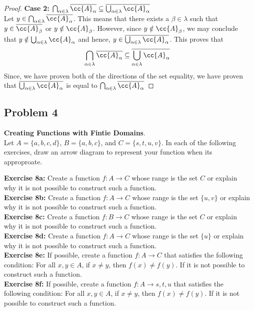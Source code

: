 \begin{proof}
        \textbf{Case 2:  $\bigcap_{\alpha \in \lambda} \overline{\cc{A}_\alpha} \subseteq \overline{\bigcup_{\alpha \in \lambda} \cc{A}_\alpha }$} \\ 
            Let $y \in \bigcap_{\alpha \in \lambda} \overline{\cc{A}_\alpha}$. This means that there exists a $\beta \in \lambda$ such that $y \in \overline{\cc{A}_\beta}$ or $y \notin \cc{A}_\beta$. However, since $y \notin \cc{A}_\beta$, we may conclude that $y \notin \bigcup_{\alpha \in \lambda} \cc{A}_\alpha$ and hence, $y \in  \overline{\bigcup_{\alpha \in \lambda} \cc{A}_\alpha }$. This proves that
                \begin{equation*}
                    \bigcap_{\alpha \in \lambda} \overline{\cc{A}_\alpha} \subseteq \overline{\bigcup_{\alpha \in \lambda} \cc{A}_\alpha }
                \end{equation*}
        Since, we have proven both of the directions of the set equality, we have proven that $ \overline{\bigcup_{\alpha \in \lambda} \cc{A}_\alpha }$ is equal to $\bigcap_{\alpha \in \lambda} \overline{\cc{A}_\alpha}$    
    \end{proof}




\newpage
\subsection{Problem 4}
    \begin{tcolorbox}
        \textbf{Creating Functions with Fintie Domains}. \\
        Let $A = \{a,b,c,d \}$, $B = \{ a, b, c \}$, and $C = \{s,t,u,v \}$. In each of the following exercises, draw an arrow diagram to represent your function when its approproate. 
    \end{tcolorbox}

    \textbf{Exercise 8a:} Create a function $f: A \to C$ whose range is the set $C$ or explain why it is not possible to construct such a function. \\
    \textbf{Exercise 8b:} Create a function $f: A \to C$ whose range is the set $\{u, v \}$ or explain why it is not possible to construct such a function. \\
    \textbf{Exercise 8c:} Create a function $f: B \to C$ whose range is the set $C$ or explain why it is not possible to construct such a function. \\
    \textbf{Exercise 8d:} Create a function $f: A \to C$ whose range is the set $\{u\}$ or explain why it is not possible to construct such a function. \\
    \textbf{Exercise 8e:} If possible, create a function $f : A \to C$ that satisfies the following condition: For all $x,y \in A$, if $x \neq y$, then $f(x) \neq f(y)$. If it is not possible to construct such a function. \\
    \textbf{Exercise 8f:} If possible, create a function $f : A \to {s,t,u}$ that satisfies the following condition: For all $x,y \in A$, if $x \neq y$, then $f(x) \neq f(y)$. If it is not possible to construct such a function. \\



